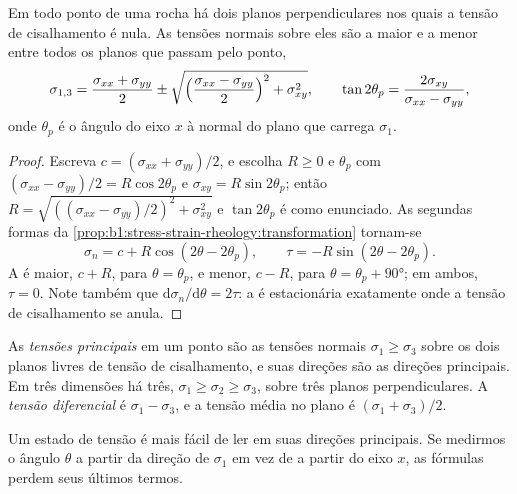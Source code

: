\begin{theorem}\label{thm:b1:stress-strain-rheology:principal}
Em todo ponto de uma rocha há dois planos perpendiculares nos quais a tensão de cisalhamento é nula. As tensões normais sobre eles são a maior e a menor  entre todos os planos que passam pelo ponto,
\[
  \sigma_{1,3} = \frac{\sigma_{xx}+\sigma_{yy}}{2} \pm
  \sqrt{\Bigl(\frac{\sigma_{xx}-\sigma_{yy}}{2}\Bigr)^2 + \sigma_{xy}^2},
  \qquad \tan2\theta_p = \frac{2\sigma_{xy}}{\sigma_{xx}-\sigma_{yy}},
\]
onde $\theta_p$ é o ângulo do eixo $x$ à normal do plano que carrega $\sigma_1$.
\end{theorem}

\begin{proof}
Escreva $c = (\sigma_{xx}+\sigma_{yy})/2$, e escolha $R \ge 0$ e $\theta_p$
com $(\sigma_{xx}-\sigma_{yy})/2 = R\cos2\theta_p$ e
$\sigma_{xy} = R\sin2\theta_p$; então
$R = \sqrt{((\sigma_{xx}-\sigma_{yy})/2)^2 + \sigma_{xy}^2}$ e
$\tan2\theta_p$ é como enunciado. As segundas formas da
\cref{prop:b1:stress-strain-rheology:transformation} tornam-se
\[
  \sigma_n = c + R\cos(2\theta - 2\theta_p), \qquad \tau = -R\sin(2\theta - 2\theta_p).
\]
A  é maior, $c + R$, para $\theta = \theta_p$, e menor, $c - R$, para $\theta = \theta_p + \ang{90}$; em ambos, $\tau = 0$. Note também que $\mathrm d\sigma_n/\mathrm d\theta = 2\tau$: a  é estacionária exatamente onde a tensão de cisalhamento se anula.
\end{proof}

\begin{definition}\label{def:b1:stress-strain-rheology:principal}
As \emph{tensões principais} em um ponto são as tensões normais $\sigma_1 \ge \sigma_3$ sobre os dois planos livres de tensão de cisalhamento, e suas direções são as direções principais. Em três dimensões há três, $\sigma_1 \ge \sigma_2 \ge \sigma_3$, sobre três planos perpendiculares. A \emph{tensão diferencial} é $\sigma_1 - \sigma_3$, e a tensão média no plano é $(\sigma_1+\sigma_3)/2$.
\end{definition}

Um estado de tensão é mais fácil de ler em suas direções principais. Se medirmos o ângulo $\theta$ a partir da direção de $\sigma_1$ em vez de a partir do eixo $x$, as fórmulas perdem seus últimos termos.

